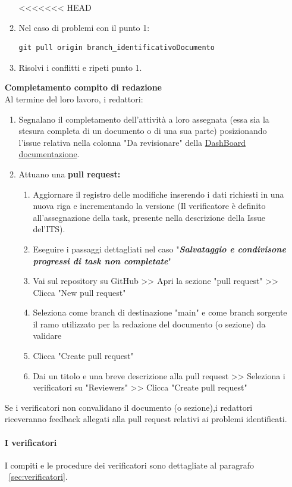 \documentclass{article}
\begin{document}
\begin{enumerate}
\begin{enumerate}
<<<<<<< HEAD
    \item Nel caso di problemi con il punto 1:
          \begin{lstlisting}[style=code]
   git pull origin branch_identificativoDocumento
        \end{lstlisting}
    \item Risolvi i conflitti e ripeti punto 1.
\end{enumerate}
\vspace{0.3cm}
\textbf{Completamento compito di redazione}\\
Al termine del loro lavoro, i redattori:
\begin{enumerate}
    \item Segnalano il completamento dell'attività a loro assegnata (essa sia la stesura completa di un documento o di una sua parte) posizionando l'issue relativa nella colonna "Da revisionare" della  \href{https://github.com/orgs/ByteOps-swe/projects/1/views/1}{DashBoard documentazione}.
    \item Attuano una \textbf{pull request:}
          \begin{enumerate}
              \item Aggiornare il registro delle modifiche inserendo i dati richiesti in  una nuova riga e incrementando la versione (Il verificatore è definito all'assegnazione della task, presente nella descrizione della Issue del'ITS).
              \item Eseguire i passaggi dettagliati nel caso "\textit{\textbf{Salvataggio e condivisone progressi di task non completate}}"
              \item Vai sul repository su GitHub >> Apri la sezione "pull request" >> Clicca "New pull request"
              \item Seleziona come branch di destinazione "main" e come branch sorgente il ramo utilizzato per la redazione del documento (o sezione) da validare
              \item Clicca "Create pull request"
              \item Dai un titolo e una breve descrizione alla pull request >> Seleziona i verificatori su "Reviewers" >> Clicca "Create pull request"
          \end{enumerate}
\end{enumerate}


Se i verificatori non convalidano il documento (o sezione),i redattori riceveranno feedback allegati alla pull request relativi ai problemi identificati.
\paragraph{I verificatori}
I compiti e le procedure dei verificatori sono dettagliate al paragrafo ~\ref{sec:verificatori}.

\end{enumerate}
\end{document}
